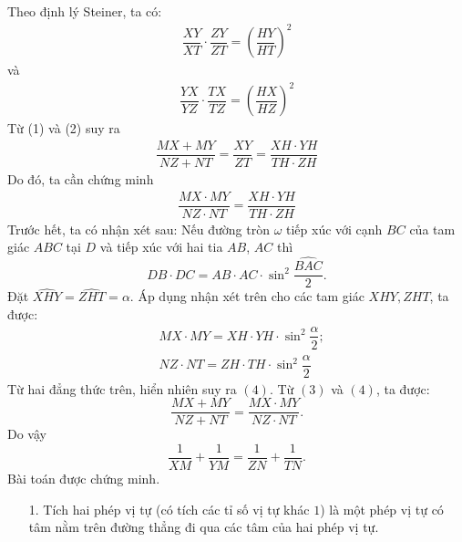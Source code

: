 \begin{bt}
{\begin{center}
\end{center}
Theo định lý Steiner, ta có:
{\allowdisplaybreaks
			\begin{align*}\dfrac{XY}{XT}\cdot \dfrac{ZY}{ZT}=\left(\dfrac{HY}{HT}\right)^2\tag{1}
			\end{align*}}và 
{\allowdisplaybreaks
			\begin{align*}\dfrac{YX}{YZ}\cdot \dfrac{TX}{TZ}=\left(\dfrac{HX}{HZ}\right)^2\tag{2}
			\end{align*}}
Từ (1) và (2) suy ra 
{\allowdisplaybreaks
			\begin{align*}\dfrac{MX+MY}{NZ+NT}=\dfrac{XY}{ZT}=\dfrac{XH\cdot YH}{TH\cdot ZH}\tag{3}
			\end{align*}}
Do đó, ta cần chứng minh 
{\allowdisplaybreaks
			\begin{align*}\dfrac{MX\cdot MY}{NZ\cdot NT}=\dfrac{XH\cdot YH}{TH\cdot ZH}\tag{4}
			\end{align*}}Trước hết, ta có nhận xét sau:		
Nếu đường tròn $\omega$ tiếp xúc với cạnh $BC$ của tam giác $ABC$ tại $D$ và tiếp xúc với hai tia $AB$, $AC$ thì 
$$DB\cdot DC=AB\cdot AC\cdot \sin^2 \dfrac{\widehat{BAC}}{2}.$$
Đặt $\widehat{XHY}=\widehat{ZHT}=\alpha$. Áp dụng nhận xét trên cho các tam giác $XHY, ZHT$, ta được:
\begin{align*}
&MX\cdot MY=XH\cdot YH\cdot \sin^2\dfrac{\alpha}{2};\\
&NZ\cdot NT=ZH\cdot TH\cdot \sin^2\dfrac{\alpha}{2}
\end{align*}
Từ hai đẳng thức trên, hiển nhiên suy ra $(4)$. Từ $(3)$ và $(4)$, ta được: 
$$\dfrac{MX+MY}{NZ+NT}=\dfrac{MX\cdot MY}{NZ\cdot NT}.$$
Do vậy
$$\dfrac{1}{XM}+\dfrac{1}{YM}=\dfrac{1}{ZN}+\dfrac{1}{TN}.$$
Bài toán được chứng minh.
\begin{nx}\hfill
\begin{itemize}
\item [1.] Tích hai phép vị tự (có tích các tỉ số vị tự khác $1$)  là một phép vị tự có tâm nằm trên đường thẳng đi qua các tâm của hai phép vị tự.

\end{itemize}
\end{nx}}
\end{bt}
